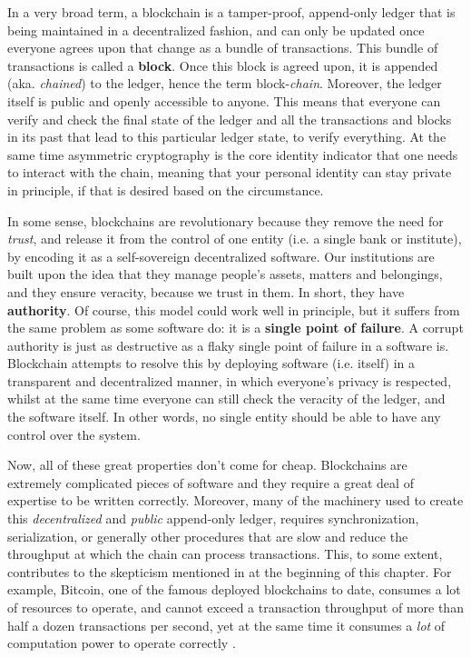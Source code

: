 In a very broad term, a blockchain is a tamper-proof, append-only ledger that is being maintained in
a decentralized fashion, and can only be updated once everyone agrees upon that change as a bundle
of transactions. This bundle of transactions is called a \textbf{block}. Once this block is agreed
upon, it is appended (aka. \textit{chained}) to the ledger, hence the term block-\textit{chain}.
Moreover, the ledger itself is public and openly accessible to anyone. This means that everyone can
verify and check the final state of the ledger and all the transactions and blocks in its past that
lead to this particular ledger state, to verify everything. At the same time asymmetric cryptography
is the core identity indicator that one needs to interact with the chain, meaning that your personal
identity can stay private in principle, if that is desired based on the circumstance.

In some sense, blockchains are revolutionary because they remove the need for \textit{trust}, and
release it from the control of one entity (i.e. a single bank or institute), by encoding it as a
self-sovereign decentralized software. Our institutions are built upon the idea that they manage
people's assets, matters and belongings, and they ensure veracity, because we trust in them. In
short, they have \textbf{authority}. Of course, this model could work well in principle, but it
suffers from the same problem as some software do: it is a \textbf{single point of failure}. A
corrupt authority is just as destructive as a flaky single point of failure in a software is.
Blockchain attempts to resolve this by deploying software (i.e. itself) in a transparent and
decentralized manner, in which everyone's privacy is respected, whilst at the same time everyone can
still check the veracity of the ledger, and the software itself. In other words, no single entity
should be able to have any control over the system.

Now, all of these great properties don't come for cheap. Blockchains are extremely complicated
pieces of software and they require a great deal of expertise to be written correctly. Moreover,
many of the machinery used to create this \textit{decentralized} and \textit{public} append-only
ledger, requires synchronization, serialization, or generally other procedures that are slow and
reduce the throughput at which the chain can process transactions. This, to some extent, contributes
to the skepticism mentioned in at the beginning of this chapter. For example, Bitcoin, one of the
famous deployed blockchains to date, consumes a lot of resources to operate, and cannot exceed a
transaction throughput of more than half a dozen transactions per second, yet at the same time it
consumes a \textit{lot} of computation power to operate correctly \cite{security_of_bitcoin}.

